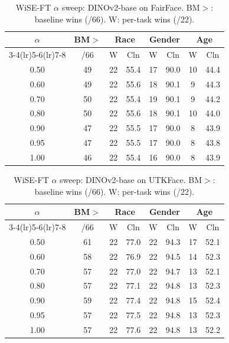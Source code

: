 \begin{table}[htbp]
\caption{WiSE-FT $\alpha$ sweep: DINOv2-base on FairFace. BM$>$: baseline wins (/66). W: per-task wins (/22).}
\label{tab:sweep_dinov2_ff}
\centering\small
\setlength{\tabcolsep}{3.5pt}
\begin{tabular}{c c cc cc cc}
\toprule
$\alpha$ & BM$>$ & \multicolumn{2}{c}{Race} & \multicolumn{2}{c}{Gender} & \multicolumn{2}{c}{Age} \\
\cmidrule(lr){3-4}\cmidrule(lr){5-6}\cmidrule(lr){7-8}
 & /66 & W & Cln & W & Cln & W & Cln \\
\midrule
0.50 & 49 & 22 & 55.4 & 17 & 90.0 & 10 & 44.4 \\
0.60 & 49 & 22 & 55.6 & 18 & 90.1 & 9 & 44.3 \\
0.70 & 50 & 22 & 55.4 & 19 & 90.1 & 9 & 44.2 \\
0.80 & 50 & 22 & 55.6 & 18 & 90.1 & 10 & 44.0 \\
0.90 & 47 & 22 & 55.5 & 17 & 90.0 & 8 & 43.9 \\
0.95 & 47 & 22 & 55.5 & 17 & 90.0 & 8 & 43.8 \\
1.00 & 46 & 22 & 55.4 & 16 & 90.0 & 8 & 43.9 \\
\bottomrule
\end{tabular}
\end{table}


\begin{table}[htbp]
\caption{WiSE-FT $\alpha$ sweep: DINOv2-base on UTKFace. BM$>$: baseline wins (/66). W: per-task wins (/22).}
\label{tab:sweep_dinov2_utk}
\centering\small
\setlength{\tabcolsep}{3.5pt}
\begin{tabular}{c c cc cc cc}
\toprule
$\alpha$ & BM$>$ & \multicolumn{2}{c}{Race} & \multicolumn{2}{c}{Gender} & \multicolumn{2}{c}{Age} \\
\cmidrule(lr){3-4}\cmidrule(lr){5-6}\cmidrule(lr){7-8}
 & /66 & W & Cln & W & Cln & W & Cln \\
\midrule
0.50 & 61 & 22 & 77.0 & 22 & 94.3 & 17 & 52.1 \\
0.60 & 58 & 22 & 76.9 & 22 & 94.5 & 14 & 52.3 \\
0.70 & 57 & 22 & 77.0 & 22 & 94.7 & 13 & 52.1 \\
0.80 & 57 & 22 & 77.1 & 22 & 94.8 & 13 & 52.3 \\
0.90 & 59 & 22 & 77.4 & 22 & 94.8 & 15 & 52.4 \\
0.95 & 57 & 22 & 77.5 & 22 & 94.8 & 13 & 52.3 \\
1.00 & 57 & 22 & 77.6 & 22 & 94.8 & 13 & 52.2 \\
\bottomrule
\end{tabular}
\end{table}


